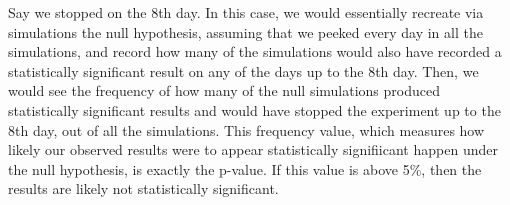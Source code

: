 \documentclass{article}
\begin{document}
Say we stopped on the 8th day. 
In this case, we would essentially recreate via simulations the null hypothesis, assuming that we peeked every day in all the simulations, and record how many of the simulations would also have recorded a statistically significant result on any of the days up to the 8th day.
Then, we would see the frequency of how many of the null simulations produced statistically significant results and would have stopped the experiment up to the 8th day, out of all the simulations.
This frequency value, which measures how likely our observed results were to appear statistically signifiicant happen under the null hypothesis, is exactly the p-value.
If this value is above 5\%, then the results are likely not statistically significant.
\end{document}
